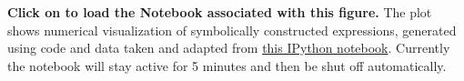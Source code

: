\textbf{\label{fig:2}} \textbf{Click on  to load the Notebook associated with this figure.} The plot shows numerical visualization of symbolically constructed expressions, generated using code and data taken and adapted from \href{http://nbviewer.ipython.org/static/img/example-nb/sympy.png}{this IPython notebook}.  Currently the notebook will stay active for 5 minutes and then be shut off automatically.